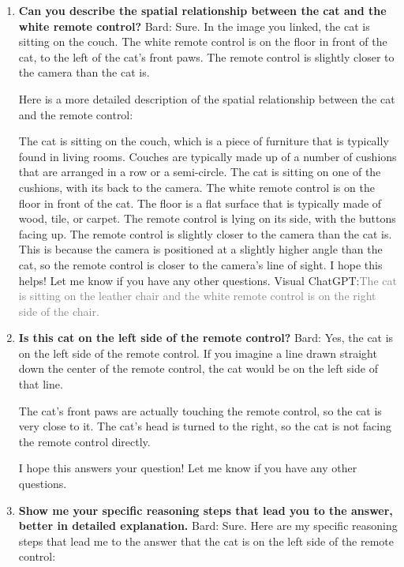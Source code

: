     \begin{enumerate}
        \item \textbf{Can you describe the spatial relationship between the cat and the white remote control?}
        \subitem Bard: 
        Sure. In the image you linked, the cat is sitting on the couch. The white remote control is on the floor in front of the cat, to the left of the cat's front paws. The remote control is slightly closer to the camera than the cat is.
        
        Here is a more detailed description of the spatial relationship between the cat and the remote control:
        
        The cat is sitting on the couch, which is a piece of furniture that is typically found in living rooms. Couches are typically made up of a number of cushions that are arranged in a row or a semi-circle. The cat is sitting on one of the cushions, with its back to the camera.
        The white remote control is on the floor in front of the cat. The floor is a flat surface that is typically made of wood, tile, or carpet. The remote control is lying on its side, with the buttons facing up.
        The remote control is slightly closer to the camera than the cat is. This is because the camera is positioned at a slightly higher angle than the cat, so the remote control is closer to the camera's line of sight.
        I hope this helps! Let me know if you have any other questions.
        \subitem Visual ChatGPT:\textcolor{gray}{The cat is sitting on the leather chair and the white remote control is on the right side of the chair.}
        \item \textbf{Is this cat on the left side of the remote control?}
        \subitem Bard: 
        Yes, the cat is on the left side of the remote control. If you imagine a line drawn straight down the center of the remote control, the cat would be on the left side of that line.
        
        The cat's front paws are actually touching the remote control, so the cat is very close to it. The cat's head is turned to the right, so the cat is not facing the remote control directly.
        
        I hope this answers your question! Let me know if you have any other questions.
        \item \textbf{Show me your specific reasoning steps that lead you to the answer, better in detailed explanation.}
        \subitem Bard: 
        Sure. Here are my specific reasoning steps that lead me to the answer that the cat is on the left side of the remote control:


\end{enumerate}
